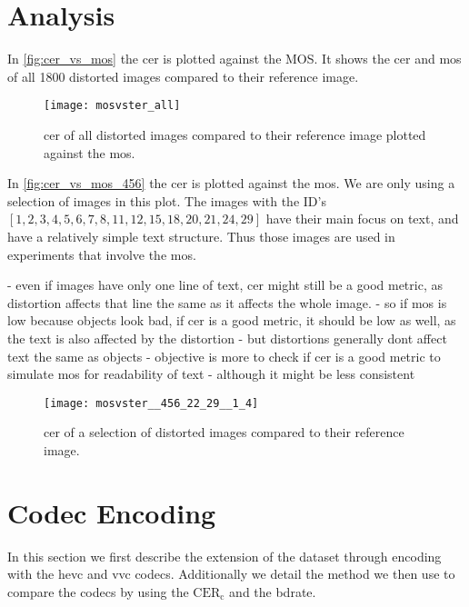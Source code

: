 \section{Analysis}
\label{sec:dataset_analysis}

In \autoref{fig:cer_vs_mos} the cer is plotted against the MOS.
It shows the \gls{cer} and \gls{mos} of all 1800 distorted images compared to their reference image.

\begin{figure}[h]
    \centering
    \texttt{[image: mosvster\_all]}
    \caption{\gls{cer} of all distorted images compared to their reference image plotted against the \gls{mos}.}
    \label{fig:cer_vs_mos}
\end{figure}

In \autoref{fig:cer_vs_mos_456} the \gls{cer} is plotted against the \gls{mos}.
We are only using a selection of images in this plot.
The images with the ID's $[1, 2, 3, 4, 5, 6, 7, 8, 11, 12, 15, 18, 20, 21, 24, 29]$ have their main focus on text, and have a relatively simple text structure.
Thus those images are used in experiments that involve the \gls{mos}.

- even if images have only one line of text, cer might still be a good metric, as distortion affects that line the same as it affects the whole image.
- so if mos is low because objects look bad, if cer is a good metric, it should be low as well, as the text is also affected by the distortion
- but distortions generally dont affect text the same as objects
- objective is more to check if cer is a good metric to simulate mos for readability of text
- although it might be less consistent
\begin{figure}[h]
    \centering
    \texttt{[image: mosvster\_\_456\_22\_29\_\_1\_4]}
    \caption{\gls{cer} of a selection of distorted images compared to their reference image.}
    \label{fig:cer_vs_mos_456}
\end{figure}

\section{Codec Encoding}
\label{sec:dataset_codec}

In this section we first describe the extension of the dataset through encoding with the \gls{hevc} and \gls{vvc} codecs.
Additionally we detail the method we then use to compare the codecs by using the $\text{CER}_{\text{c}}$ and the \gls{bdrate}.

